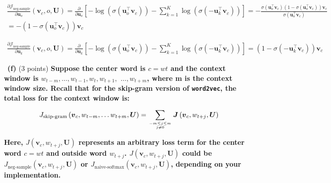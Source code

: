 \documentclass[a4 paper]{article}
\newcommand{\subproblem}[1]{~\newline\textbf{(#1)}}
\newcommand{\wtv}{\texttt{word2vec}}
\begin{document}
\begin{equation}
    \begin{aligned}
        \frac{\partial \mathcal J_{\text {neg-sample}}}{\partial \boldsymbol{u}_o}
        \left(\boldsymbol{v}_{c}, o, \boldsymbol{U}\right)
        = \frac{\partial}{\partial \boldsymbol{u}_o} [- \log \left(\sigma\left(\boldsymbol{u}_{o}^{\top} \boldsymbol{v}_{c}\right)\right) - \sum_{k=1}^{K} \log \left(\sigma\left(-\boldsymbol{u}_{k}^{\top} \boldsymbol{v}_{c}\right)\right)]
        = - \frac{\sigma\left(\boldsymbol{u}_{o}^{\top} \boldsymbol{v}_{c}\right)(1-\sigma\left(\boldsymbol{u}_{o}^{\top} \boldsymbol{v}_{c}\right))\boldsymbol{v}_{c}}{\sigma\left(\boldsymbol{u}_{o}^{\top} \boldsymbol{v}_{c}\right)} \\
        = -(1-\sigma\left(\boldsymbol{u}_{o}^{\top} \boldsymbol{v}_{c}\right))\boldsymbol{v}_{c}
    \end{aligned}
\end{equation}

\begin{equation}
    \begin{aligned}
        \frac{\partial \mathcal J_{\text {neg-sample}}}{\partial \boldsymbol{u}_k}
        \left(\boldsymbol{v}_{c}, o, \boldsymbol{U}\right)
        = \frac{\partial}{\partial \boldsymbol{u}_k} [- \log \left(\sigma\left(\boldsymbol{u}_{o}^{\top} \boldsymbol{v}_{c}\right)\right) - \sum_{k=1}^{K} \log \left(\sigma\left(-\boldsymbol{u}_{k}^{\top} \boldsymbol{v}_{c}\right)\right)]
        = \left(1- \sigma\left(-\boldsymbol{u}_{k}^{\top} \boldsymbol{v}_{c}\right)\right)\boldsymbol{v}_{c}
    \end{aligned}
\end{equation}

\subproblem{f} (3 points) \textbf{Suppose the center word is $c = wt$ and the context window is $w_{t-m}, \dots, w_{t-1},w_t,w_{t+1},$ $\dots,w_{t+m}$, where m is the context window size.
Recall that for the skip-gram version of \wtv, the total loss for the context window is:}

\begin{equation}
    J_{\text {skip-gram}}\left(\boldsymbol{v}_{c}, w_{t-m}, \ldots w_{t+m}, \boldsymbol{U}\right)
    =\sum_{-m \leq j \leq m \atop j \neq 0} \boldsymbol{J}\left(\boldsymbol{v}_{c}, w_{t+j}, \boldsymbol{U}\right)
\end{equation}

\textbf{Here, $J\left(\boldsymbol{v}_{c}, w_{t+j}, \boldsymbol{U}\right)$ represents an arbitrary loss term for the center word $c= wt$ and outside word $w_{t+j}$.
$J\left(\boldsymbol{v}_{c}, w_{t+j}, \boldsymbol{U}\right)$ could be $J_{\text{neg-sample}}\left(\boldsymbol{v}_{c}, w_{t+j}, \boldsymbol{U}\right)$ or $J_{\text{naive-softmax}}\left(\boldsymbol{v}_{c}, w_{t+j}, \boldsymbol{U}\right)$, depending on your implementation.}
\end{document}
